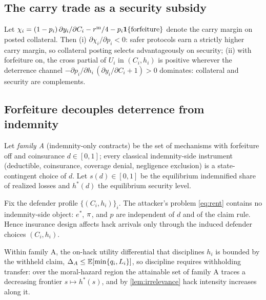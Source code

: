 \subsection{The carry trade as a security subsidy}\label{sec:carry}

\begin{proposition}\label{prop:carry}
Let $\chi_i = (1 - p_i)\,\partial y_i/\partial C_i - r^{\mathrm{m}}/4 -
p_i \mathbf{1}\{\text{forfeiture}\}$ denote the carry margin on posted
collateral. Then (i) $\partial \chi_i / \partial p_i < 0$: safer
protocols earn a strictly higher carry margin, so collateral posting
selects advantageously on security; (ii) with forfeiture on, the cross
partial of $U_i$ in $(C_i, h_i)$ is positive wherever the deterrence
channel $-\partial p_i/\partial h_i\,(\partial y_i/\partial C_i + 1) > 0$
dominates: collateral and security are complements.
\end{proposition}

\subsection{Forfeiture decouples deterrence from indemnity}\label{sec:decoupling}

Let \emph{family A} (indemnity-only contracts) be the set of mechanisms
with forfeiture off and coinsurance $d \in [0,1]$; every classical
indemnity-side instrument (deductible, coinsurance, coverage denial,
negligence exclusion) is a state-contingent choice of $d$. Let
$s(d) \in [0,1]$ be the equilibrium indemnified share of realized losses
and $h^*(d)$ the equilibrium security level.

\begin{lemma}\label{lem:irrelevance}
Fix the defender profile $\{(C_i, h_i)\}_i$. The attacker's problem
\eqref{eq:rent} contains no indemnity-side object: $e^*$, $\pi$, and
$p$ are independent of $d$ and of the claim rule. Hence insurance design
affects hack arrivals only through the induced defender choices
$(C_i, h_i)$.
\end{lemma}

\begin{lemma}\label{lem:frontier}
Within family A, the on-hack utility differential that disciplines
$h_i$ is bounded by the withheld claim,
$\Delta_A \leq \mathbb{E}[\min\{q_i, L_i\}]$, so discipline requires
withholding transfer: over the moral-hazard region the attainable set of
family A traces a decreasing frontier $s \mapsto h^*(s)$, and by
\cref{lem:irrelevance} hack intensity increases along it.
\end{lemma}

